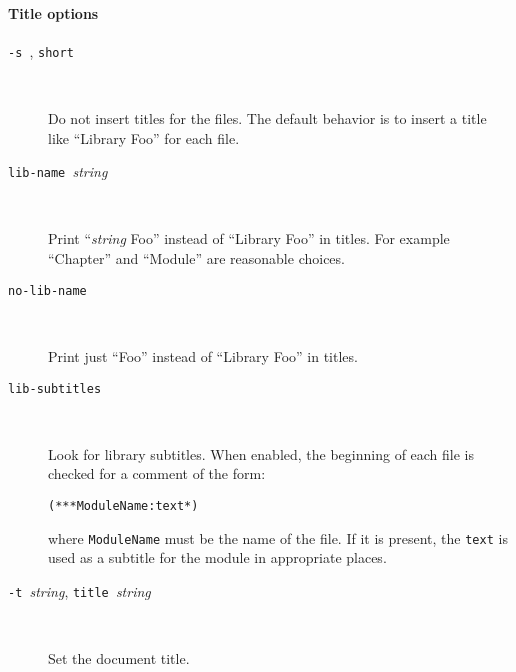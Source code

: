 \paragraph{Title options}
\begin{description}
\item[\texttt{-s }, \texttt{\mm{}short}] ~\par

  Do not insert titles for the files. The default behavior is to
  insert a title like ``Library Foo'' for each file.

\item[\texttt{\mm{}lib-name }\textit{string}] ~\par

  Print ``\textit{string} Foo'' instead of ``Library Foo'' in titles.
  For example ``Chapter'' and ``Module'' are reasonable choices.

\item[\texttt{\mm{}no-lib-name}] ~\par

  Print just ``Foo'' instead of ``Library Foo'' in titles.

\item[\texttt{\mm{}lib-subtitles}] ~\par

  Look for library subtitles.  When enabled, the beginning of each
  file is checked for a comment of the form:
\begin{alltt}
(** * ModuleName : text *)
\end{alltt}
  where \texttt{ModuleName} must be the name of the file.  If it is
  present, the \texttt{text} is used as a subtitle for the module in
  appropriate places.

\item[\texttt{-t }\textit{string},
      \texttt{\mm{}title }\textit{string}] ~\par

  Set the document title.

\end{description}

